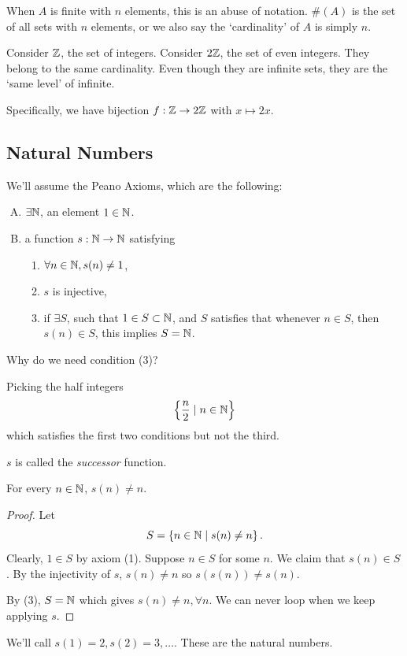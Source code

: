 \begin{remark}
    When $A$ is finite with $n$ elements, this is an abuse of notation. $\#(A)$ is the set of all sets with $n$ elements, or we also say the `cardinality' of $A$ is simply $n$.
\end{remark}

\begin{example}
    Consider $\mathbb Z$, the set of integers. Consider $2\mathbb Z$, the set of even integers. They belong to the same cardinality. Even though they are infinite sets, they are the `same level' of infinite.

    Specifically, we have bijection $f: \mathbb Z\to 2\mathbb Z$ with $x\mapsto 2x$.
\end{example}

\subsection{Natural Numbers}
We'll assume the Peano Axioms, which are the following:
\begin{enumerate}[A.]
    \item $\exists \mathbb N$, an element $1\in \mathbb N$.
    \item a function $s: \mathbb N\to \mathbb N$ satisfying
          \begin{enumerate}[(1)]
              \item $\forall n\in \mathbb N, s(n) \neq 1$,
              \item $s$ is injective,
              \item if $\exists S$, such that $1\in S\subset \mathbb N$, and $S$ satisfies that whenever $n\in S$, then $s(n)\in S$, this implies $S = \mathbb N$.
          \end{enumerate}
\end{enumerate}

Why do we need condition (3)?
\begin{example}
    Picking the half integers
    \[\left\{\frac{n}{2}\mid n\in \mathbb N\right\}\]
    which satisfies the first two conditions but not the third.
\end{example}

$s$ is called the \emph{successor} function.

\begin{proposition}
    For every $n\in \mathbb N$, $s(n)\neq n$.
\end{proposition}
\begin{proof}
    Let
    \[S = \left\{ n\in \mathbb N\mid s(n) \neq n \right\}.\]
    Clearly, $1\in S$ by axiom (1). Suppose $n\in S$ for some $n$. We claim that $s(n)\in S$. By the injectivity of $s$, $s(n)\neq n$ so $s(s(n)) \neq s(n)$.

    By (3), $S = \mathbb N$ which gives $s(n)\neq n, \forall n$. We can never loop when we keep applying $s$.
\end{proof}
\begin{definition}
    We'll call $s(1) = 2, s(2) = 3, \dots$. These are the natural numbers.
\end{definition}